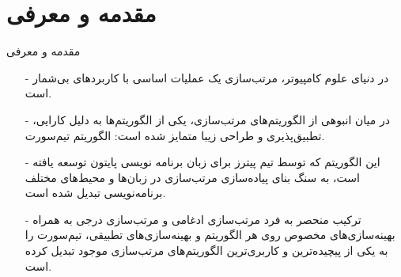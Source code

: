 \section{مقدمه و معرفی}
\begin{frame}{مقدمه و معرفی}
\begin{itemize}\itemr
\item[-]
در دنیای علوم کامپیوتر، مرتب‌سازی یک عملیات اساسی با کاربرد‌های بی‌شمار است.

\item[-]
در میان انبوهی از الگوریتم‌های مرتب‌سازی، یکی از الگوریتم‌ها به دلیل کارایی، تطبیق‌پذیری و طراحی زیبا متمایز شده است: الگوریتم تیم‌سورت.

\item[-]
این الگوریتم که توسط تیم پیترز برای زبان برنامه نویسی پایتون توسعه یافته است، به سنگ بنای پیاده‌سازی مرتب‌سازی در زبان‌ها و محیط‌های مختلف برنامه‌نویسی تبدیل شده است.

\item[-]
ترکیب منحصر به فرد مرتب‌سازی ادغامی و مرتب‌سازی درجی به همراه‌ بهینه‌سازی‌های مخصوص روی هر الگوریتم و بهینه‌سازی‌های تطبیقی‌، تیم‌سورت را به یکی از پیچیده‌ترین و کاربری‌ترین الگوریتم‌های مرتب‌سازی موجود تبدیل کرده است.
\end{itemize}
\end{frame}

